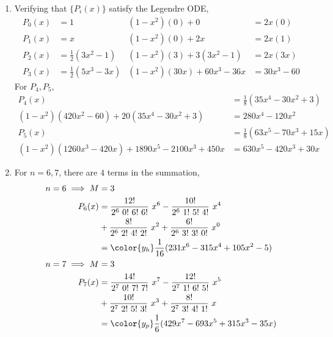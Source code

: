 \begin{enumerate}
    \item Verifying that $ \{P_i(x)\} $ satisfy the Legendre ODE,
          \begin{align}
              P_0(x)                     & = 1                      &
              (1-x^2)(0) + 0             & = 2x(0)                    \\
              P_1(x)                     & = x                      &
              (1-x^2)(0) + 2x            & = 2x(1)                    \\
              P_2(x)                     & = \frac{1}{2}(3x^2 - 1)  &
              (1-x^2)(3) + 3(3x^2 - 1)   & = 2x(3x)                   \\
              P_3(x)                     & = \frac{1}{2}(5x^3 - 3x) &
              (1-x^2)(30x) + 60x^3 - 36x & = 30x^3 - 60
          \end{align}
          For $ P_4, P_5 $,
          \begin{align}
              P_4(x) & = \frac{1}{8}(35x^4 - 30x^2 + 3)  \\
              (1-x^2)(420x^2 - 60) + 20(35x^4 - 30x^2 + 3)
                     & = 280x^4 - 120x^2                 \\
              P_5(x) & = \frac{1}{8}(63x^5 -70x^3 + 15x) \\
              (1 - x^2)(1260x^3 - 420x) + 1890x^5 - 2100x^3 + 450x
                     & = 630x^5 - 420x^3 + 30x
          \end{align}

    \item For $ n= 6, 7 $, there are $ 4 $ terms in the summation,
          \begin{align}
              n = 6 \implies M & = 3                                         \\
              P_6(x)           & = \frac{12!}{2^6\ 0!\ 6!\ 6!}\ x^6
              - \frac{10!}{2^6\ 1!\ 5!\ 4!}\ x^4                             \\
                               & + \frac{8!}{2^6\ 2!\ 4!\ 2!}\ x^2
              + \frac{6!}{2^6\ 3!\ 3!\ 0!}\ x^0                              \\
                               & = {\color{y_h} \frac{1}{16}(231x^6 - 315x^4
              + 105x^2 - 5)}                                                 \\
              n = 7 \implies M & = 3                                         \\
              P_7(x)           & = \frac{14!}{2^7\ 0!\ 7!\ 7!}\ x^7
              - \frac{12!}{2^7\ 1!\ 6!\ 5!}\ x^5                             \\
                               & + \frac{10!}{2^7\ 2!\ 5!\ 3!}\ x^3
              + \frac{8!}{2^7\ 3!\ 4!\ 1!}\ x                                \\
                               & = {\color{y_p}\frac{1}{6}(429x^7 - 693x^5
              + 315x^3 - 35x)}
          \end{align}


\end{enumerate}
